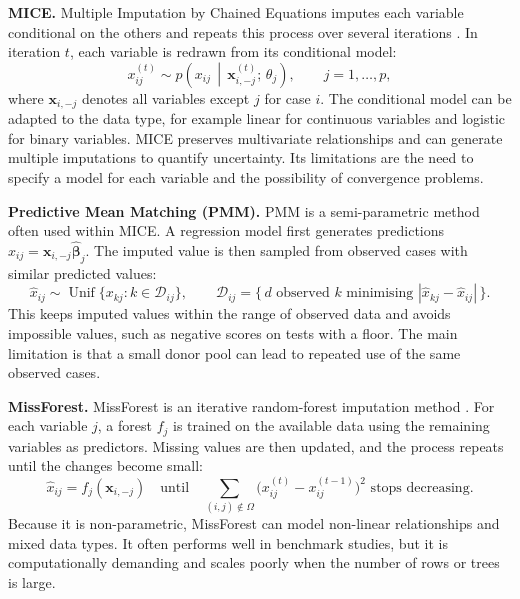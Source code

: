 \textbf{MICE.} Multiple Imputation by Chained Equations imputes each variable conditional on the others and repeats this process over several iterations \parencite{vanbuuren2011mice}. In iteration $t$, each variable is redrawn from its conditional model:
\begin{equation}\label{eq:mice}
x_{ij}^{(t)}\sim p\!\left(x_{ij}\,\middle|\,\mathbf{x}_{i,-j}^{(t)};\,\theta_j\right),\qquad j=1,\dots,p,
\end{equation}
where $\mathbf{x}_{i,-j}$ denotes all variables except $j$ for case $i$. The conditional model can be adapted to the data type, for example linear for continuous variables and logistic for binary variables. MICE preserves multivariate relationships and can generate multiple imputations to quantify uncertainty. Its limitations are the need to specify a model for each variable and the possibility of convergence problems.

\textbf{Predictive Mean Matching (PMM).} PMM is a semi-parametric method often used within MICE. A regression model first generates predictions $\hat{x}_{ij}=\mathbf{x}_{i,-j}\hat{\boldsymbol\beta}_j$. The imputed value is then sampled from observed cases with similar predicted values:
\begin{equation}\label{eq:pmm}
\hat{x}_{ij}\sim\operatorname{Unif}\bigl\{x_{kj}:k\in\mathcal{D}_{ij}\bigr\},\qquad
\mathcal{D}_{ij}=\bigl\{\,d\text{ observed }k\text{ minimising }|\hat{x}_{kj}-\hat{x}_{ij}|\,\bigr\}.
\end{equation}
This keeps imputed values within the range of observed data and avoids impossible values, such as negative scores on tests with a floor. The main limitation is that a small donor pool can lead to repeated use of the same observed cases.

\textbf{MissForest.} MissForest is an iterative random-forest imputation method \parencite{stekhoven2012missforest}. For each variable $j$, a forest $f_j$ is trained on the available data using the remaining variables as predictors. Missing values are then updated, and the process repeats until the changes become small:
\begin{equation}\label{eq:missforest}
\hat{x}_{ij}=f_j\!\left(\mathbf{x}_{i,-j}\right)\quad\text{until}\quad \sum_{(i,j)\notin\Omega}\bigl(x_{ij}^{(t)}-x_{ij}^{(t-1)}\bigr)^2 \text{ stops decreasing.}
\end{equation}
Because it is non-parametric, MissForest can model non-linear relationships and mixed data types. It often performs well in benchmark studies, but it is computationally demanding and scales poorly when the number of rows or trees is large.

